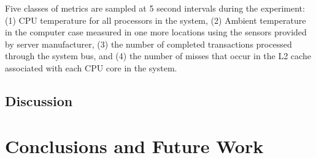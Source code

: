 \documentclass[12pt,onecolumn]{ULieeetran}
\begin{document}
Five classes of metrics are sampled at 5 second intervals during the
experiment: (1) CPU temperature for all processors in the system, (2)
Ambient temperature in the computer case measured in one more locations
using the sensors provided by server manufacturer, (3) the number of
completed transactions processed through the system bus, and (4) the
number of misses that occur in the L2 cache associated with each CPU
core in the system.

\subsection{Discussion}
\label{sec:discussions}


\section{Conclusions and Future Work}
\label{sec:conclusions}

\label{sec:references}


%

\end{document}
